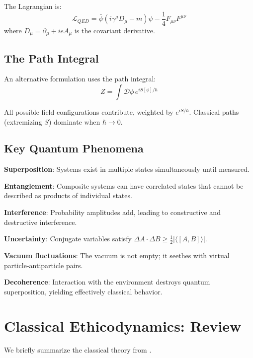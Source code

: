 \documentclass[12pt]{article}
\begin{document}
The Lagrangian is:
\begin{equation}
    \mathcal{L}_{QED} = \bar{\psi}(i\gamma^\mu D_\mu - m)\psi - \frac{1}{4} F_{\mu\nu} F^{\mu\nu}
\end{equation}
where $D_\mu = \partial_\mu + ieA_\mu$ is the covariant derivative.

\subsection{The Path Integral}

An alternative formulation uses the path integral:
\begin{equation}
    Z = \int \mathcal{D}\phi \, e^{iS[\phi]/\hbar}
\end{equation}

All possible field configurations contribute, weighted by $e^{iS/\hbar}$. Classical paths (extremizing $S$) dominate when $\hbar \to 0$.

\subsection{Key Quantum Phenomena}

\textbf{Superposition}: Systems exist in multiple states simultaneously until measured.

\textbf{Entanglement}: Composite systems can have correlated states that cannot be described as products of individual states.

\textbf{Interference}: Probability amplitudes add, leading to constructive and destructive interference.

\textbf{Uncertainty}: Conjugate variables satisfy $\Delta A \cdot \Delta B \geq \frac{1}{2} |\langle [A,B] \rangle|$.

\textbf{Vacuum fluctuations}: The vacuum is not empty; it seethes with virtual particle-antiparticle pairs.

\textbf{Decoherence}: Interaction with the environment destroys quantum superposition, yielding effectively classical behavior.

\section{Classical Ethicodynamics: Review}

We briefly summarize the classical theory from \cite{bond2025noether}.
\end{document}
